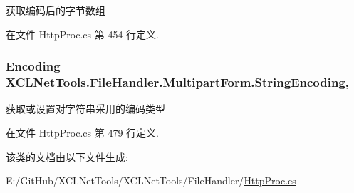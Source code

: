 获取编码后的字节数组 



在文件 Http\+Proc.\+cs 第 454 行定义.

\subsubsection[{\texorpdfstring{String\+Encoding}{StringEncoding}}]{\setlength{\rightskip}{0pt plus 5cm}Encoding X\+C\+L\+Net\+Tools.\+File\+Handler.\+Multipart\+Form.\+String\+Encoding\hspace{0.3cm}{\ttfamily [get]}, {\ttfamily [set]}}\hypertarget{class_x_c_l_net_tools_1_1_file_handler_1_1_multipart_form_ade83206c0e41ad24ba543ebd89e0281f}{}\label{class_x_c_l_net_tools_1_1_file_handler_1_1_multipart_form_ade83206c0e41ad24ba543ebd89e0281f}


获取或设置对字符串采用的编码类型 



在文件 Http\+Proc.\+cs 第 479 行定义.



该类的文档由以下文件生成\+:\begin{DoxyCompactItemize}
\item 
E\+:/\+Git\+Hub/\+X\+C\+L\+Net\+Tools/\+X\+C\+L\+Net\+Tools/\+File\+Handler/\hyperlink{_http_proc_8cs}{Http\+Proc.\+cs}\end{DoxyCompactItemize}
